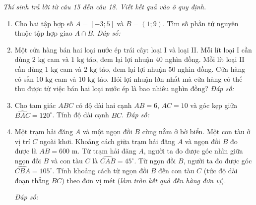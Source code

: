 \documentclass[12pt,a4paper]{article}
\newcommand{\parttitle}[1]{\par\vspace{2pt}{\large\bfseries\color{ink}#1}\par\vspace{1pt}}
\newcommand{\answerbox}{\hfill\textit{Đáp số:}\ \fbox{\rule{0pt}{12pt}\hspace{2.2cm}}}
\begin{document}
\parttitle{PHẦN III. Trắc nghiệm trả lời ngắn}
\textit{Thí sinh trả lời từ câu 15 đến câu 18. Viết kết quả vào ô quy định.}
\begin{enumerate}[resume]
\item Cho hai tập hợp số $A = [-3; 5]$ và $B = (1; 9)$. Tìm số phần tử nguyên thuộc tập hợp giao $A \cap B$.
\answerbox

\item Một cửa hàng bán hai loại nước ép trái cây: loại I và loại II. Mỗi lít loại I cần dùng $2\text{ kg}$ cam và $1\text{ kg}$ táo, đem lại lợi nhuận $40$ nghìn đồng. Mỗi lít loại II cần dùng $1\text{ kg}$ cam và $2\text{ kg}$ táo, đem lại lợi nhuận $50$ nghìn đồng. Cửa hàng có sẵn $10\text{ kg}$ cam và $10\text{ kg}$ táo. Hỏi lợi nhuận lớn nhất mà cửa hàng có thể thu được từ việc bán hai loại nước ép là bao nhiêu nghìn đồng?
\answerbox

\item Cho tam giác $ABC$ có độ dài hai cạnh $AB = 6$, $AC = 10$ và góc kẹp giữa $\widehat{BAC} = 120^\circ$. Tính độ dài cạnh $BC$.
\answerbox

\item \begin{minipage}[t]{0.62\linewidth}
Một trạm hải đăng $A$ và một ngọn đồi $B$ cùng nằm ở bờ biển. Một con tàu ở vị trí $C$ ngoài khơi. Khoảng cách giữa trạm hải đăng $A$ và ngọn đồi $B$ đo được là $AB = 600\text{ m}$. Từ trạm hải đăng $A$, người ta đo được góc nhìn giữa ngọn đồi $B$ và con tàu $C$ là $\widehat{CAB} = 45^\circ$. Từ ngọn đồi $B$, người ta đo được góc $\widehat{CBA} = 105^\circ$. Tính khoảng cách từ ngọn đồi $B$ đến con tàu $C$ (tức độ dài đoạn thẳng $BC$) theo đơn vị mét (\textit{làm tròn kết quả đến hàng đơn vị}).
\vspace{6pt}

\answerbox
\end{minipage}\hfill
\begin{minipage}[t]{0.35\linewidth}
\centering
{}
\end{minipage}
\end{enumerate}
\end{document}

